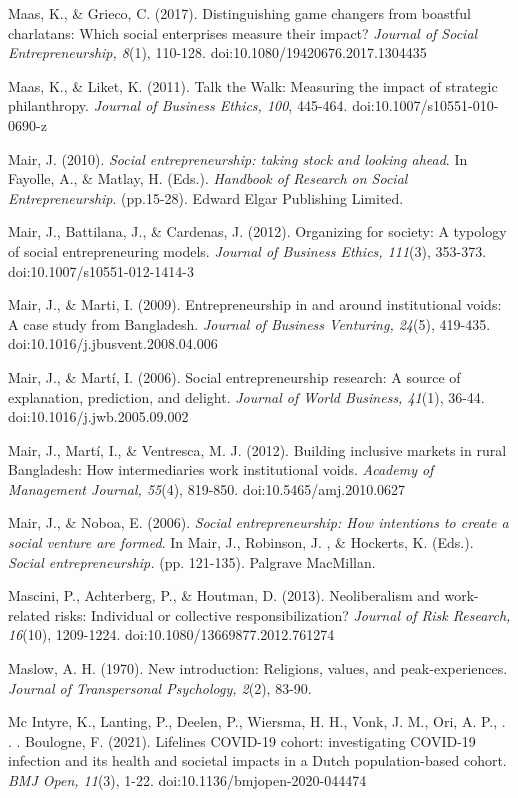 \documentclass{article}
\begin{document}
Maas, K., \& Grieco, C. (2017). Distinguishing game changers from boastful charlatans: Which social enterprises measure their impact? \emph{Journal of Social Entrepreneurship, 8}(1), 110-128. doi:10.1080/19420676.2017.1304435

Maas, K., \& Liket, K. (2011). Talk the Walk: Measuring the impact of strategic philanthropy. \emph{Journal of Business Ethics, 100}, 445-464. doi:10.1007/s10551-010-0690-z

Mair, J. (2010). \emph{Social entrepreneurship: taking stock and looking ahead}. In Fayolle, A., \& Matlay, H. (Eds.). \emph{Handbook of Research on Social Entrepreneurship}. (pp.15-28). Edward Elgar Publishing Limited.

Mair, J., Battilana, J., \& Cardenas, J. (2012). Organizing for society: A typology of social entrepreneuring models. \emph{Journal of Business Ethics, 111}(3), 353-373. doi:10.1007/s10551-012-1414-3

Mair, J., \& Marti, I. (2009). Entrepreneurship in and around institutional voids: A case study from Bangladesh. \emph{Journal of Business Venturing, 24}(5), 419-435. doi:10.1016/j.jbusvent.2008.04.006

Mair, J., \& Martí, I. (2006). Social entrepreneurship research: A source of explanation, prediction, and delight. \emph{Journal of World Business, 41}(1), 36-44. doi:10.1016/j.jwb.2005.09.002

Mair, J., Martí, I., \& Ventresca, M. J. (2012). Building inclusive markets in rural Bangladesh: How intermediaries work institutional voids. \emph{Academy of Management Journal, 55}(4), 819-850. doi:10.5465/amj.2010.0627

Mair, J., \& Noboa, E. (2006). \emph{Social entrepreneurship: How intentions to create a social venture are formed}. In Mair, J., Robinson, J. , \& Hockerts, K. (Eds.). \emph{Social entrepreneurship.} (pp. 121-135). Palgrave MacMillan.

Mascini, P., Achterberg, P., \& Houtman, D. (2013). Neoliberalism and work-related risks: Individual or collective responsibilization? \emph{Journal of Risk Research, 16}(10), 1209-1224. doi:10.1080/13669877.2012.761274

Maslow, A. H. (1970). New introduction: Religions, values, and peak-experiences. \emph{Journal of Transpersonal Psychology, 2}(2), 83-90. 

Mc Intyre, K., Lanting, P., Deelen, P., Wiersma, H. H., Vonk, J. M., Ori, A. P., . . . Boulogne, F. (2021). Lifelines COVID-19 cohort: investigating COVID-19 infection and its health and societal impacts in a Dutch population-based cohort. \emph{BMJ Open, 11}(3), 1-22. doi:10.1136/bmjopen-2020-044474
\end{document}
